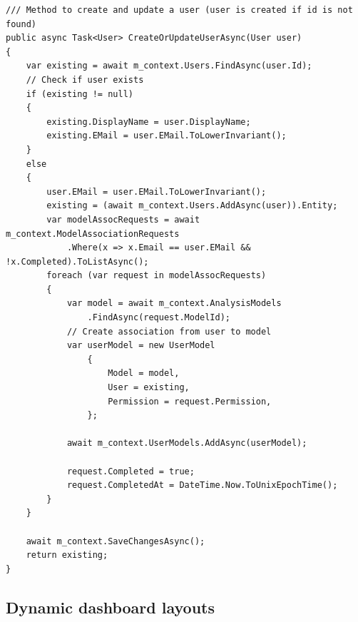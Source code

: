 \begin{lstlisting}[style=csharp, caption=Create user method, label=lst:user-update-method]
/// Method to create and update a user (user is created if id is not found)
public async Task<User> CreateOrUpdateUserAsync(User user)
{
    var existing = await m_context.Users.FindAsync(user.Id);
    // Check if user exists
    if (existing != null)
    {
        existing.DisplayName = user.DisplayName;
        existing.EMail = user.EMail.ToLowerInvariant();
    }
    else
    {
        user.EMail = user.EMail.ToLowerInvariant();
        existing = (await m_context.Users.AddAsync(user)).Entity;
        var modelAssocRequests = await m_context.ModelAssociationRequests
            .Where(x => x.Email == user.EMail && !x.Completed).ToListAsync();
        foreach (var request in modelAssocRequests)
        {
            var model = await m_context.AnalysisModels
                .FindAsync(request.ModelId);
            // Create association from user to model
            var userModel = new UserModel 
                { 
                    Model = model, 
                    User = existing, 
                    Permission = request.Permission, 
                };
            
            await m_context.UserModels.AddAsync(userModel);

            request.Completed = true;
            request.CompletedAt = DateTime.Now.ToUnixEpochTime();
        }
    }

    await m_context.SaveChangesAsync();
    return existing;
}
\end{lstlisting}


\subsection{Dynamic dashboard layouts}

